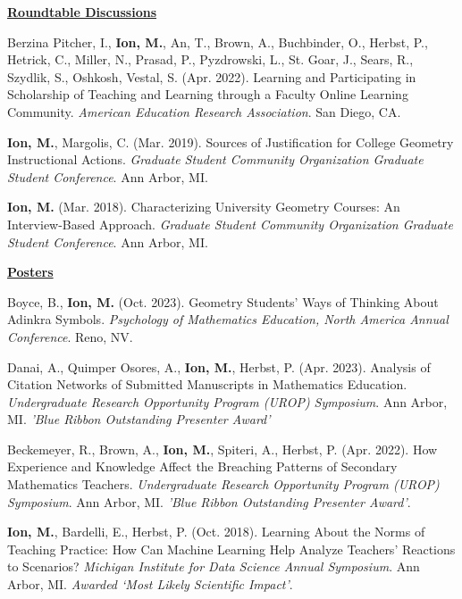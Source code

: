 \documentclass[margin,line]{res}
\newenvironment{list3}{
        \begin{list}{\ding{113}}{%
            \setlength{\itemsep}{0in}
            \setlength{\parsep}{0in} \setlength{\parskip}{0in}
            \setlength{\topsep}{0in} \setlength{\partopsep}{0in}
            \setlength{\leftmargin}{0in}
            \setlength{\rightmargin}{1.25in}}}{\end{list}}
\renewcommand{\subsection}[1]{%
      \par\vspace{3pt}%
      \underline{\normalsize\bfseries #1}%
      \par\vspace{3pt}%
    }
\begin{document}
\begin{resume}
\subsection{\sc Roundtable Discussions}
\begin{list3}
  \item Berzina Pitcher, I., \textbf{Ion, M.}, An, T., Brown, A., Buchbinder, O., Herbst, P., Hetrick, C., Miller, N., Prasad, P., Pyzdrowski, L., St. Goar, J., Sears, R., Szydlik, S., Oshkosh, Vestal, S. (Apr. 2022). Learning and Participating in Scholarship of Teaching and Learning through a Faculty Online Learning Community. \textit{American Education Research Association}. San Diego, CA. 
  \item \textbf{Ion, M.}, Margolis, C. (Mar. 2019). Sources of Justification for College Geometry Instructional Actions. \textit{Graduate Student Community Organization Graduate Student Conference}. Ann Arbor, MI. 
  \item \textbf{Ion, M.} (Mar. 2018). Characterizing University Geometry Courses: An Interview-Based Approach. \textit{Graduate Student Community Organization Graduate Student Conference}. Ann Arbor, MI. 
\end{list3}

\subsection{\sc Posters} 
\begin{list3}
  \item Boyce, B., \textbf{Ion, M.} (Oct. 2023). Geometry Students' Ways of Thinking About Adinkra Symbols. \textit{Psychology of Mathematics Education, North America Annual Conference}. Reno, NV. 
  \item Danai, A., Quimper Osores, A., \textbf{Ion, M.}, Herbst, P. (Apr. 2023). Analysis of Citation Networks of Submitted Manuscripts in Mathematics Education. \textit{Undergraduate Research Opportunity Program (UROP) Symposium}. Ann Arbor, MI. \textit{'Blue Ribbon Outstanding Presenter Award'}
  \item Beckemeyer, R., Brown, A., \textbf{Ion, M.}, Spiteri, A., Herbst, P. (Apr. 2022). How Experience and Knowledge Affect the Breaching Patterns of Secondary Mathematics Teachers. \textit{Undergraduate Research Opportunity Program (UROP) Symposium}. Ann Arbor, MI. \textit{'Blue Ribbon Outstanding Presenter Award'}.
  \item \textbf{Ion, M.}, Bardelli, E., Herbst, P. (Oct. 2018). Learning About the Norms of Teaching Practice: How Can Machine Learning Help Analyze Teachers' Reactions to Scenarios? \textit{Michigan Institute for Data Science Annual Symposium}. Ann Arbor, MI. \textit{Awarded `Most Likely Scientific Impact'}.
\end{list3}


\end{resume}
\end{document}
